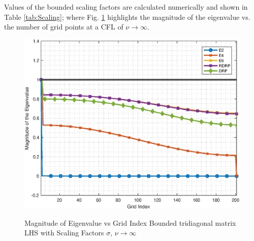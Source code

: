 \documentclass[conf]{new-aiaa}
\begin{document}
%  
Values of the bounded scaling factors are calculated numerically and shown in Table \ref{tab:Scaling}; where Fig. \ref{fig:index_vs_mag_Scaling_Bounded} highlights the magnitude of the eigenvalue vs. the number of grid points at a CFL of $\nu\to\infty$. 


\begin{figure}[hbtp!]
	\centering
	{\includegraphics[width=.7\textwidth]{Figures/index_vs_mag_ScaleFactor_Bounded}}
	\caption{Magnitude of Eigenvalue vs Grid Index 
	Bounded tridiagonal matrix LHS with Scaling Factors $\sigma$, $\nu\to\infty$}
	\label{fig:index_vs_mag_Scaling_Bounded}
\end{figure}
\end{document}
